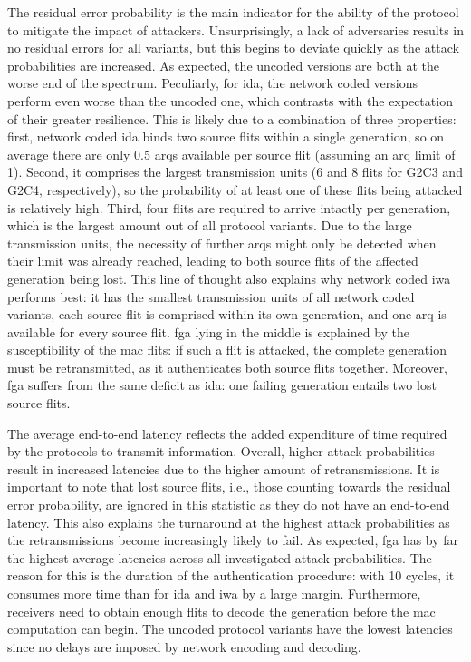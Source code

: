 The residual error probability is the main indicator for the ability of the protocol to mitigate the impact of attackers. Unsurprisingly, a lack of
adversaries results in no residual errors for all variants, but this begins to deviate quickly as the attack probabilities are increased. As expected,
the uncoded versions are both at the worse end of the spectrum. Peculiarly, for \gls{ida}, the network coded versions perform even worse than the
uncoded one, which contrasts with the expectation of their greater resilience. This is likely due to a combination of three properties: first, network
coded \gls{ida} binds two source flits within a single generation, so on average there are only 0.5 \glspl{arq} available per source flit (assuming an
\gls{arq} limit of 1). Second, it comprises the largest transmission units (6 and 8 flits for G2C3 and G2C4, respectively), so the probability of at
least one of these flits being attacked is relatively high. Third, four flits are required to arrive intactly per generation, which is the largest
amount out of all protocol variants. Due to the large transmission units, the necessity of further \glspl{arq} might only be detected when
their limit was already reached, leading to both source flits of the affected generation being lost. This line of thought also explains why network
coded \gls{iwa} performs best: it has the smallest transmission units of all network coded variants, each source flit is comprised within its own
generation, and one \gls{arq} is available for every source flit. \Gls{fga} lying in the middle is explained by the susceptibility of the \gls{mac}
flits: if such a flit is attacked, the complete generation must be retransmitted, as it authenticates both source flits together. Moreover, \gls{fga}
suffers from the same deficit as \gls{ida}: one failing generation entails two lost source flits.

The average end-to-end latency reflects the added expenditure of time required by the protocols to transmit information. Overall, higher attack
probabilities result in increased latencies due to the higher amount of retransmissions. It is important to note that lost source flits, i.e., those
counting towards the residual error probability, are ignored in this statistic as they do not have an end-to-end latency. This also explains the
turnaround at the highest attack probabilities as the retransmissions become increasingly likely to fail. As expected, \gls{fga} has by far the
highest average latencies across all investigated attack probabilities. The reason for this is the duration of the authentication procedure: with 10
cycles, it consumes more time than for \gls{ida} and \gls{iwa} by a large margin. Furthermore, receivers need to obtain enough flits to decode the
generation before the \gls{mac} computation can begin. The uncoded protocol variants have the lowest latencies since no delays are imposed by network
encoding and decoding.

